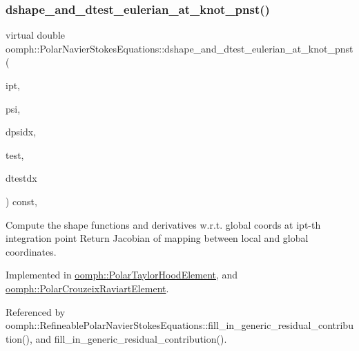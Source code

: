\subsubsection{\texorpdfstring{dshape\+\_\+and\+\_\+dtest\+\_\+eulerian\+\_\+at\+\_\+knot\+\_\+pnst()}{dshape\_and\_dtest\_eulerian\_at\_knot\_pnst()}}
{\footnotesize\ttfamily virtual double oomph\+::\+Polar\+Navier\+Stokes\+Equations\+::dshape\+\_\+and\+\_\+dtest\+\_\+eulerian\+\_\+at\+\_\+knot\+\_\+pnst (\begin{DoxyParamCaption}\item[{const unsigned \&}]{ipt,  }\item[{\hyperlink{classoomph_1_1Shape}{Shape} \&}]{psi,  }\item[{\hyperlink{classoomph_1_1DShape}{D\+Shape} \&}]{dpsidx,  }\item[{\hyperlink{classoomph_1_1Shape}{Shape} \&}]{test,  }\item[{\hyperlink{classoomph_1_1DShape}{D\+Shape} \&}]{dtestdx }\end{DoxyParamCaption}) const\hspace{0.3cm}{\ttfamily [protected]}, {}}



Compute the shape functions and derivatives w.\+r.\+t. global coords at ipt-\/th integration point Return Jacobian of mapping between local and global coordinates. 



Implemented in \hyperlink{classoomph_1_1PolarTaylorHoodElement_aa49d0cf54061ffd19e6454794efec7dc}{oomph\+::\+Polar\+Taylor\+Hood\+Element}, and \hyperlink{classoomph_1_1PolarCrouzeixRaviartElement_aadee59b06f281e88d2a29707b9179bf5}{oomph\+::\+Polar\+Crouzeix\+Raviart\+Element}.



Referenced by oomph\+::\+Refineable\+Polar\+Navier\+Stokes\+Equations\+::fill\+\_\+in\+\_\+generic\+\_\+residual\+\_\+contribution(), and fill\+\_\+in\+\_\+generic\+\_\+residual\+\_\+contribution().

\mbox{\label{classoomph_1_1PolarNavierStokesEquations_a5be752caefa4421e221aaccd4712ec11}} 
